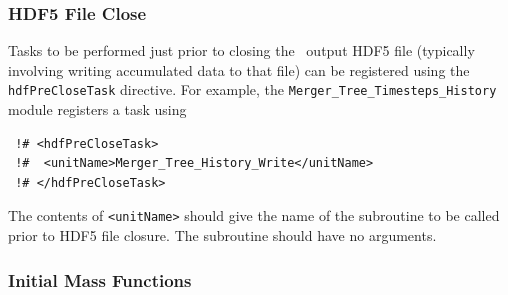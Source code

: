 \subsubsection{HDF5 File Close}

Tasks to be performed just prior to closing the \glc\ output HDF5 file (typically involving writing accumulated data to that file) can be registered using the {\tt hdfPreCloseTask} directive. For example, the {\tt Merger\_Tree\_Timesteps\_History} module registers a task using
\begin{verbatim}
 !# <hdfPreCloseTask>
 !#  <unitName>Merger_Tree_History_Write</unitName>
 !# </hdfPreCloseTask>
\end{verbatim}
The contents of {\tt <unitName>} should give the name of the subroutine to be called prior to HDF5 file closure. The subroutine should have no arguments.

\subsubsection{Initial Mass Functions}\label{sec:imfTasks}

